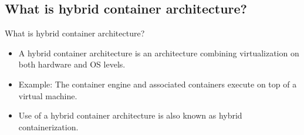 \subsection{What is hybrid container architecture?}\label{subsec:what-is-hybrid-container-architecture?}
\begin{frame}{What is hybrid container architecture?}
    \begin{itemize}[<+- | alert@+>]
        \item A hybrid container architecture is an architecture combining virtualization on both hardware and OS levels.
        \item Example: The container engine and associated containers execute on top of a virtual machine.
        \item Use of a hybrid container architecture is also known as hybrid containerization.
    \end{itemize}
\end{frame}


